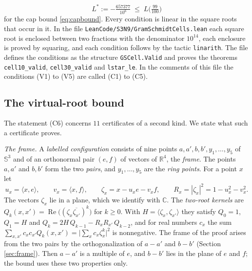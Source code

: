 \documentclass[reqno,a4paper,11pt]{amsart}
\numberwithin{equation}{section}
\def\R{{\mathbb R}}
\def\C{{\mathbb C}}
\newcommand{\Sph}{\mathbb{S}}
\newcommand{\lean}[1]{\texttt{#1}}
\newcommand{\file}[1]{\nolinkurl{#1}}
\begin{document}
\begin{equation}\label{eq:lstar}
L^* := -\tfrac{657377}{10^6} \;\leq\; L\big(\tfrac{99}{100}\big)
\end{equation}
for the cap bound \eqref{eq:capbound}. Every condition is linear in the square roots that occur in it. In the file \file{LeanCode/S3N9/GramSchmidtCells.lean} each square root is enclosed between two fractions with the denominator $10^{14}$, each enclosure is proved by squaring, and each condition follows by the tactic \texttt{linarith}. The file defines the conditions as the structure \lean{GSCell.Valid} and proves the theorems \lean{cell10\_valid}, \lean{cell30\_valid} and \lean{lstar\_le}. In the comments of this file the conditions (V1) to (V5) are called (C1) to (C5).

\subsection{The virtual-root bound}\label{sec:s3n9vr}

The statement (C6) concerns $11$ certificates of a second kind. We state what such a certificate proves.

\emph{The frame.} A \emph{labelled configuration} consists of nine points $a, a', b, b', y_1, \dots, y_5$ of $\Sph^3$ and of an orthonormal pair $(e, f)$ of vectors of $\R^4$, the \emph{frame}. The points $a, a'$ and $b, b'$ form the two \emph{pairs}, and $y_1, \dots, y_5$ are the \emph{ring points}. For a point $x$ let
$$
u_x = \langle x, e \rangle, \qquad v_x = \langle x, f \rangle, \qquad \zeta_x = x - u_x e - v_x f, \qquad R_x = |\zeta_x|^2 = 1 - u_x^2 - v_x^2 .
$$
The vectors $\zeta_x$ lie in a plane, which we identify with $\C$. The \emph{two-root kernels} are $Q_k(x, x') = \operatorname{Re} \big( (\zeta_x \overline{\zeta_{x'}})^k \big)$ for $k \geq 0$. With $H = \langle \zeta_x, \zeta_{x'} \rangle$ they satisfy $Q_0 = 1$, $Q_1 = H$ and $Q_k = 2 H \, Q_{k-1} - R_x R_{x'} \, Q_{k-2}$, and for real numbers $c_x$ the sum $\sum_{x, x'} c_x c_{x'} Q_k(x, x') = \big| \sum_x c_x \zeta_x^k \big|^2$ is nonnegative. The frame of the proof arises from the two pairs by the orthogonalization of $a - a'$ and $b - b'$ (Section \ref{sec:frame}). Then $a - a'$ is a multiple of $e$, and $b - b'$ lies in the plane of $e$ and $f$; the bound uses these two properties only.
\end{document}
